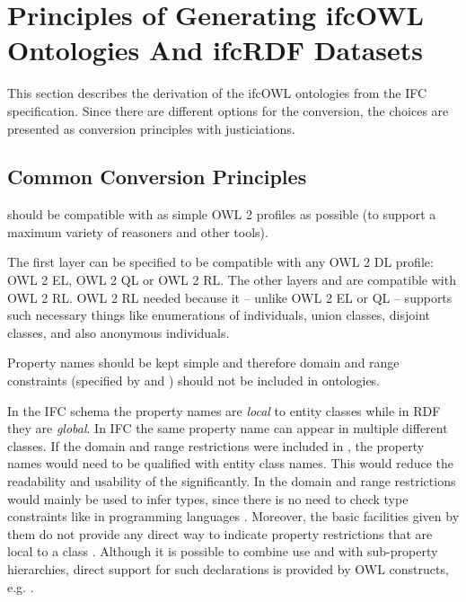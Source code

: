 
\section{Principles of Generating ifcOWL Ontologies And ifcRDF Datasets}
\label{sec:ifcOWL}
This section describes the derivation of the ifcOWL ontologies from the IFC specification. Since there are different options for the conversion, the choices are presented as conversion principles with justiciations. 

\subsection{Common Conversion Principles}

\begin{principle}%
\ifcsimple{} should be compatible with as simple OWL 2 profiles as possible (to support a maximum variety of reasoners and other tools). 
\end{principle}

The first layer \ifcsimple{} can be specified to be compatible with any OWL 2 DL profile: OWL 2 EL, OWL 2 QL or OWL 2 RL. The other layers \ifcstandard{} and \ifcextended{} are compatible with OWL 2 RL. OWL 2 RL needed because it -- unlike OWL 2 EL or QL -- supports such necessary things like enumerations of individuals, union classes, disjoint classes, and also anonymous individuals. \cite{w3c:owl2-profiles}

\begin{principle}%
Property names should be kept simple and therefore domain and range constraints (specified by  and ) should not be included in \ifcowl{} ontologies.
\end{principle}

In the IFC schema the property names are \emph{local} to entity classes while in RDF they are \emph{global}. 
In IFC the same property name can appear in multiple different classes. If the domain and range restrictions
were included in  \ifcowl{}, the property names would need to be qualified with entity class names. This 
would reduce the readability and usability of the \ifcowl{} significantly. In \ifcowl{} the domain and 
range restrictions would mainly be used to infer types, since there is no need to check type constraints 
like in programming languages \cite{w3c:owl-guide}. Moreover, the basic facilities given by them do not 
provide any direct way to indicate property restrictions that are local to a class \cite{w3c:rdf-schema}. 
Although it is possible to combine use  and  with sub-property hierarchies, 
direct support for such declarations is provided by OWL constructs, e.g. .

